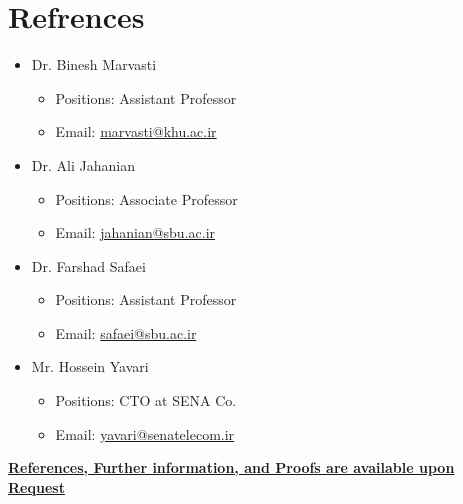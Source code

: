 \documentclass[10pt,a4paper,sans]{moderncv} %
\begin{document}
	\section{Refrences}
	\begin{itemize}
    	\item Dr. Binesh Marvasti
    	\begin{itemize}
    		\item Positions: Assistant Professor
    		\item Email: \href{mailto:marvasti@khu.ac.ir}{marvasti@khu.ac.ir}
    	\end{itemize}
    	\item Dr. Ali Jahanian
    	\begin{itemize}
    		\item Positions: Associate Professor
    		\item Email: \href{mailto:jahanian@sbu.ac.ir}{jahanian@sbu.ac.ir}
    	\end{itemize}
    	\item Dr. Farshad Safaei
    	\begin{itemize}
    		\item Positions: Assistant Professor
    		\item Email: \href{mailto:safaei@sbu.ac.ir}{safaei@sbu.ac.ir}
    	\end{itemize}    	
    	\item Mr. Hossein Yavari
    	\begin{itemize}
    		\item Positions: CTO at SENA Co.
    		\item Email: \href{mailto:yavari@senatelecom.ir}{yavari@senatelecom.ir}
    	\end{itemize}    	

	\end{itemize}
	
	


	
	\vspace{0.3em}
	\centerline{\underline{\textbf{	\faExclamationCircle \hspace{0.5 pt} References, Further information, and Proofs are available upon Request}}}
	
\end{document}
